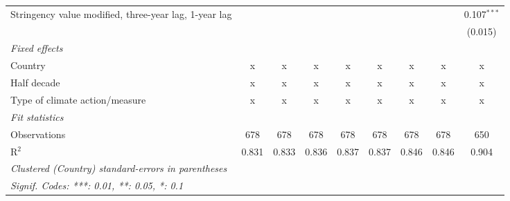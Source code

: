 \begin{table}[htbp]
\begin{tabular}{lcccccccc}
      Stringency value modified, three-year lag, 1-year lag                     &                &               &                &                &                &                &                & 0.107$^{***}$\\   
                                                                                &                &               &                &                &                &                &                & (0.015)\\   
      \emph{Fixed effects}\\
      Country                                                                   & x              & x             & x              & x              & x              & x              & x              & x\\  
      Half decade                                                               & x              & x             & x              & x              & x              & x              & x              & x\\  
      Type of climate action/measure                                            & x              & x             & x              & x              & x              & x              & x              & x\\  
      \midrule \emph{Fit statistics}\\
      Observations                                                              & 678            & 678           & 678            & 678            & 678            & 678            & 678            & 650\\  
      R$^2$                                                                     & 0.831          & 0.833         & 0.836          & 0.837          & 0.837          & 0.846          & 0.846          & 0.904\\  
      \midrule
      \multicolumn{9}{l}{\emph{Clustered (Country) standard-errors in parentheses}}\\
      \multicolumn{9}{l}{\emph{Signif. Codes: ***: 0.01, **: 0.05, *: 0.1}}\\
   \end{tabular}
\end{table}



